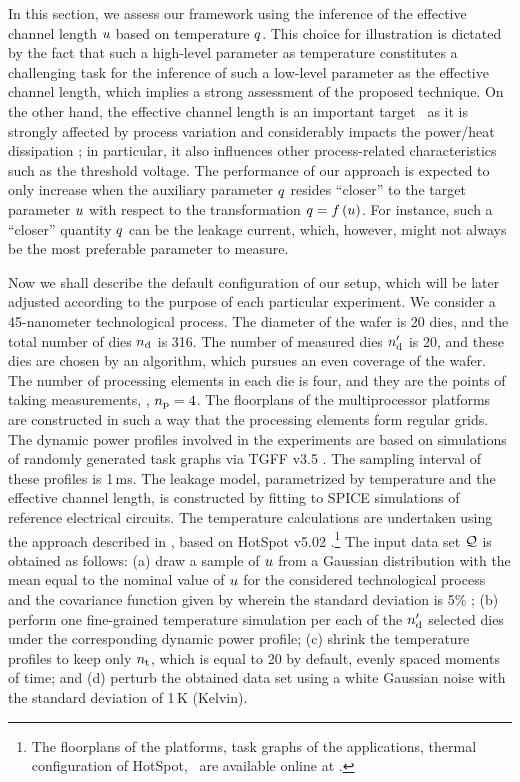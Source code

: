 
In this section, we assess our framework using the inference of the effective channel length $u$ based on temperature $q$.
This choice for illustration is dictated by the fact that such a high-level parameter as temperature constitutes a challenging task for the inference of such a low-level parameter as the effective channel length, which implies a strong assessment of the proposed technique.
On the other hand, the effective channel length is an important target \perse\ as it is strongly affected by process variation and considerably impacts the power/heat dissipation \cite{chandrakasan2001, srivastava2010, juan2012}; in particular, it also influences other process-related characteristics such as the threshold voltage.
The performance of our approach is expected to only increase when the auxiliary parameter $q$ resides ``closer'' to the target parameter $u$ with respect to the transformation $\q = \oBB{\u}$.
For instance, such a ``closer'' quantity $q$ can be the leakage current, which, however, might not always be the most preferable parameter to measure.

Now we shall describe the default configuration of our setup, which will be later adjusted according to the purpose of each particular experiment.
We consider a 45-nanometer technological process.
The diameter of the wafer is 20 dies, and the total number of dies ${n_\text{d}}$ is 316.
The number of measured dies ${n_\text{d}'}$ is 20, and these dies are chosen by an algorithm, which pursues an even coverage of the wafer.
The number of processing elements in each die is four, and they are the points of taking measurements, \ie, ${n_\text{p}} = 4$.
The floorplans of the multiprocessor platforms are constructed in such a way that the processing elements form regular grids.
The dynamic power profiles involved in the experiments are based on simulations of randomly generated task graphs via TGFF v3.5 \cite{dick1998}.
The sampling interval of these profiles is 1$\,$ms.
The leakage model, parametrized by temperature and the effective channel length, is constructed by fitting to SPICE simulations of reference electrical circuits.
The temperature calculations are undertaken using the approach described in \cite{ukhov2012}, based on HotSpot v5.02 \cite{skadron2004}.\footnote{The floorplans of the platforms, task graphs of the applications, thermal configuration of HotSpot, \etc\ are available online at \cite{sources}.}
The input data set $\mathcal{Q}$ is obtained as follows: (a) draw a sample of $u$ from a Gaussian distribution with the mean equal to the nominal value of $u$ for the considered technological process and the covariance function given by  wherein the standard deviation is 5\% \cite{juan2012}; (b) perform one fine-grained temperature simulation per each of the ${n_\text{d}'}$ selected dies under the corresponding dynamic power profile; (c) shrink the temperature profiles to keep only ${n_\text{t}}$, which is equal to 20 by default, evenly spaced moments of time; and (d) perturb the obtained data set using a white Gaussian noise with the standard deviation of 1$\,$K (Kelvin).

